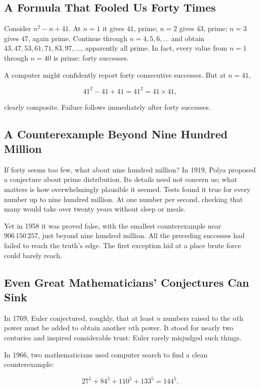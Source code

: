 \subsection{A Formula That Fooled Us Forty Times}

Consider $n^2 - n + 41$. At $n=1$ it gives $41$, prime; $n=2$ gives $43$, prime; $n=3$ gives $47$, again prime. Continue through $n=4,5,6,\dots$ and obtain $43,47,53,61,71,83,97,\dots$, apparently all prime. In fact, every value from $n=1$ through $n=40$ is prime: forty successes.

A computer might confidently report forty consecutive successes. But at $n=41$,

\[41^2 - 41 + 41 = 41^2 = 41 \times 41,\]

clearly composite. Failure follows immediately after forty successes.

\subsection{A Counterexample Beyond Nine Hundred Million}

If forty seems too few, what about nine hundred million? In 1919, Polya proposed a conjecture about prime distribution. Its details need not concern us; what matters is how overwhelmingly plausible it seemed. Tests found it true for every number up to nine hundred million. At one number per second, checking that many would take over twenty years without sleep or meals.

Yet in 1958 it was proved false, with the smallest counterexample near $906\,150\,257$, just beyond nine hundred million. All the preceding successes had failed to reach the truth's edge. The first exception hid at a place brute force could barely reach.

\subsection{Even Great Mathematicians' Conjectures Can Sink}

In 1769, Euler conjectured, roughly, that at least $n$ numbers raised to the $n$th power must be added to obtain another $n$th power. It stood for nearly two centuries and inspired considerable trust: Euler rarely misjudged such things.

In 1966, two mathematicians used computer search to find a clean counterexample:

\[27^5 + 84^5 + 110^5 + 133^5 = 144^5.\]

